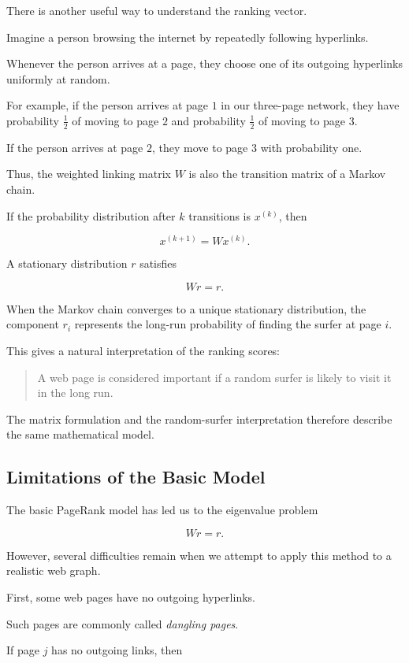 \documentclass[11pt,a4paper]{article}
\theoremstyle{definition}
\theoremstyle{remark}
\begin{document}
There is another useful
way to understand the
ranking vector.

Imagine a person browsing
the internet by repeatedly
following hyperlinks.

Whenever the person
arrives at a page,
they choose one of
its outgoing hyperlinks
uniformly at random.

For example, if the
person arrives at page $1$
in our three-page network,
they have probability
$\frac12$ of moving to
page $2$ and probability
$\frac12$ of moving to
page $3$.

If the person arrives
at page $2$, they move
to page $3$ with
probability one.

Thus, the weighted
linking matrix $W$
is also the transition
matrix of a Markov chain.

If the probability
distribution after $k$
transitions is $x^{(k)}$,
then

\[
x^{(k+1)}=Wx^{(k)}.
\]

A stationary distribution
$r$ satisfies

\[
Wr=r.
\]

When the Markov chain
converges to a unique
stationary distribution,
the component $r_i$
represents the long-run
probability of finding
the surfer at page $i$.

This gives a natural
interpretation of
the ranking scores:

\begin{quote}
A web page is considered
important if a random
surfer is likely to
visit it in the long run.
\end{quote}

The matrix formulation
and the random-surfer
interpretation therefore
describe the same
mathematical model.


\subsection{Limitations of the Basic Model}

The basic PageRank model
has led us to the
eigenvalue problem

\[
Wr=r.
\]

However, several difficulties
remain when we attempt
to apply this method
to a realistic web graph.

First, some web pages
have no outgoing hyperlinks.

Such pages are commonly
called \emph{dangling pages}.

If page $j$ has no
outgoing links, then
\end{document}

